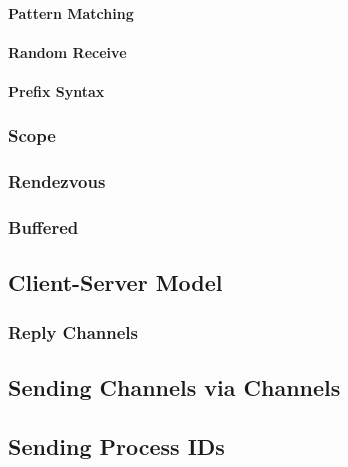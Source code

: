 \documentclass[a4paper, 11pt, accentcolor = tud3b]{tudreport}
\begin{document}
					\paragraph{Pattern Matching} %

					\paragraph{Random Receive} %

					\paragraph{Prefix Syntax} %

				\subsubsection{Scope} %

				\subsubsection{Rendezvous} %

				\subsubsection{Buffered} %

			\subsection{Client-Server Model} %

				\subsubsection{Reply Channels} %

			\subsection{Sending Channels via Channels} %

			\subsection{Sending Process IDs} %
\end{document}
